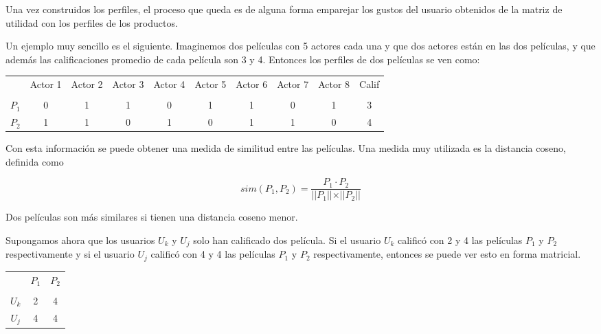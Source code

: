 Una vez construidos los perfiles, el proceso que queda es de alguna forma emparejar los gustos del usuario obtenidos de la matriz de utilidad con los perfiles de los productos.

Un ejemplo muy sencillo es el siguiente. Imaginemos dos películas con 5 actores cada una y que dos actores están en las dos películas, y que además las calificaciones promedio de cada película son 3 y 4. Entonces los perfiles de dos películas se ven como:

\begin{center}
\begin{tabular}{ c | c  c c c c c c c c}
    & Actor 1 & Actor 2 & Actor 3 & Actor 4 & Actor 5 & Actor 6 & Actor 7 & Actor 8 & Calif \\ \\
  \hline                       
$P_1$ & 0 & 1 & 1 & 0 & 1 & 1 & 0 & 1 & 3 \\
$P_2$ & 1 & 1 & 0 & 1 & 0 & 1 & 1 & 0 & 4 \\
  \hline  
\end{tabular}
\end{center}

Con esta información se puede obtener una medida de similitud entre las películas. Una medida muy utilizada es la distancia coseno, definida como

\begin{equation}
sim(P_1, P_2) = \dfrac{P_1 \cdot P_2}{\vert \vert P_1 \vert \vert \times \vert \vert P_2 \vert \vert}
\end{equation}

Dos películas son más similares si tienen una distancia coseno menor.

Supongamos ahora que los usuarios $U_k$ y $U_j$ solo han calificado dos película. Si el usuario $U_k$ calificó con 2 y 4 las películas $P_1$ y $P_2$ respectivamente y si el usuario $U_j$ calificó con 4 y 4 las películas $P_1$ y $P_2$ respectivamente, entonces se puede ver esto en forma matricial.

\begin{center}
\begin{tabular}{ c | c  c }
    & $P_1$ & $P_2$ \\ \\
  \hline                       
$U_k$ & 2 & 4 \\
$U_j$ & 4 & 4 \\
  \hline  
\end{tabular}
\end{center}


